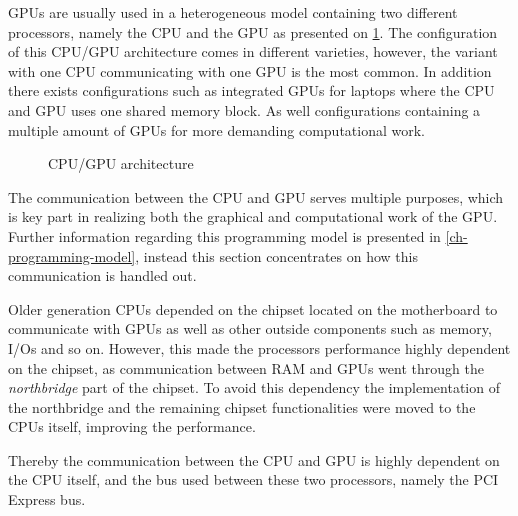 GPUs are usually used in a heterogeneous model containing two different processors, namely the CPU and the GPU as presented on \cref{fig:hw-cpu-gpu}.
The configuration of this CPU/GPU architecture comes in different varieties, however, the variant with one CPU communicating with one GPU is the most common.
In addition there exists configurations such as integrated GPUs for laptops where the CPU and GPU uses one shared memory block.
As well configurations containing a multiple amount of GPUs for more demanding computational work.

\begin{figure}[ht]
	\centering
	\caption{CPU/GPU architecture}
	\label{fig:hw-cpu-gpu}
\end{figure}

The communication between the CPU and GPU serves multiple purposes, which is key part in realizing both the graphical and computational work of the GPU.
Further information regarding this programming model is presented in \cref{ch-programming-model}, instead this section concentrates on how this communication is handled out.

Older generation CPUs depended on the chipset located on the motherboard to communicate with GPUs as well as other outside components such as memory, I/Os and so on.
However, this made the processors performance highly dependent on the chipset, as communication between RAM and GPUs went through the \textit{northbridge} part of the chipset.
To avoid this dependency the implementation of the northbridge and the remaining chipset functionalities were moved to the CPUs itself, improving the performance.

Thereby the communication between the CPU and GPU is highly dependent on the CPU itself, and the bus used between these two processors, namely the PCI Express bus.








